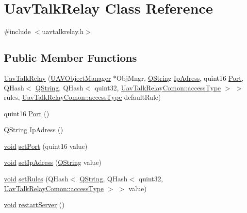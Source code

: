 \hypertarget{class_uav_talk_relay}{\section{\-Uav\-Talk\-Relay \-Class \-Reference}
\label{class_uav_talk_relay}
}


{\ttfamily \#include $<$uavtalkrelay.\-h$>$}

\subsection*{\-Public \-Member \-Functions}
\begin{DoxyCompactItemize}
\item 
\hyperlink{group___u_a_v_talk_gac8b1e7722bbeccbae7c3dcea8d1fe222}{\-Uav\-Talk\-Relay} (\hyperlink{class_u_a_v_object_manager}{\-U\-A\-V\-Object\-Manager} $\ast$\-Obj\-Mngr, \hyperlink{group___u_a_v_objects_plugin_gab9d252f49c333c94a72f97ce3105a32d}{\-Q\-String} \hyperlink{group___u_a_v_talk_ga8f99b1f0add7784e3aad75a0784728bb}{\-Ip\-Adress}, quint16 \hyperlink{group___u_a_v_talk_gaa880d4612e6112e7a8c320cca690f31a}{\-Port}, \-Q\-Hash$<$ \hyperlink{group___u_a_v_objects_plugin_gab9d252f49c333c94a72f97ce3105a32d}{\-Q\-String}, \-Q\-Hash$<$ quint32, \hyperlink{group___u_a_v_talk_plugin_gae73e1677650d617d825cf2224fa0626a}{\-Uav\-Talk\-Relay\-Comon\-::access\-Type} $>$ $>$ rules, \hyperlink{group___u_a_v_talk_plugin_gae73e1677650d617d825cf2224fa0626a}{\-Uav\-Talk\-Relay\-Comon\-::access\-Type} default\-Rule)
\item 
quint16 \hyperlink{group___u_a_v_talk_gaa880d4612e6112e7a8c320cca690f31a}{\-Port} ()
\item 
\hyperlink{group___u_a_v_objects_plugin_gab9d252f49c333c94a72f97ce3105a32d}{\-Q\-String} \hyperlink{group___u_a_v_talk_ga8f99b1f0add7784e3aad75a0784728bb}{\-Ip\-Adress} ()
\item 
\hyperlink{group___u_a_v_objects_plugin_ga444cf2ff3f0ecbe028adce838d373f5c}{void} \hyperlink{group___u_a_v_talk_ga5ef623c050c9d1a65536f7de2eeda738}{set\-Port} (quint16 value)
\item 
\hyperlink{group___u_a_v_objects_plugin_ga444cf2ff3f0ecbe028adce838d373f5c}{void} \hyperlink{group___u_a_v_talk_gaae8733ac23163492f5ea685cc69950ca}{set\-Ip\-Adress} (\hyperlink{group___u_a_v_objects_plugin_gab9d252f49c333c94a72f97ce3105a32d}{\-Q\-String} value)
\item 
\hyperlink{group___u_a_v_objects_plugin_ga444cf2ff3f0ecbe028adce838d373f5c}{void} \hyperlink{group___u_a_v_talk_ga61c935860a7d4f77e40c58c10557eed4}{set\-Rules} (\-Q\-Hash$<$ \hyperlink{group___u_a_v_objects_plugin_gab9d252f49c333c94a72f97ce3105a32d}{\-Q\-String}, \-Q\-Hash$<$ quint32, \hyperlink{group___u_a_v_talk_plugin_gae73e1677650d617d825cf2224fa0626a}{\-Uav\-Talk\-Relay\-Comon\-::access\-Type} $>$ $>$ value)
\item 
\hyperlink{group___u_a_v_objects_plugin_ga444cf2ff3f0ecbe028adce838d373f5c}{void} \hyperlink{group___u_a_v_talk_gac7de28de1557a197ee88c192917bca40}{restart\-Server} ()
\end{DoxyCompactItemize}


